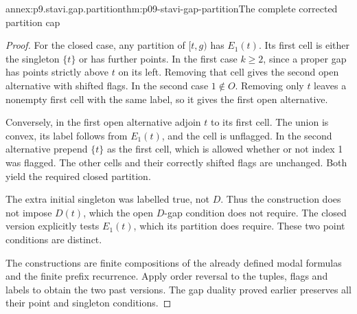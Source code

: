 \begin{annexitem}{annex:p9.stavi.gap.partition}{thm:p09-stavi-gap-partition}{The complete corrected partition cap}
\begin{proof}
For the closed
case, any
partition of
\([t,g)\)
has \(E_1(t)\).
Its first cell
is either the
singleton
\(\{t\}\)
or has further
points. In
the first
case \(k\geq2\),
since a proper
gap has points
strictly above
\(t\) on
its left.
Removing that
cell gives
the second
open alternative
with shifted
flags.
In the
second case
\(1\notin O\).
Removing only
\(t\) leaves
a nonempty
first cell
with the
same label,
so it gives
the first
open alternative.

Conversely, in
the first
open alternative
adjoin \(t\)
to its first
cell. The
union is
convex, its
label follows
from \(E_1(t)\),
and the cell
is unflagged.
In the
second alternative
prepend
\(\{t\}\)
as the
first cell,
which is
allowed whether
or not
index 1
was flagged.
The other
cells and
their correctly
shifted flags
are unchanged.
Both yield
the required
closed partition.

The extra
initial singleton
was labelled
true, not
\(D\).
Thus the
construction
does not
impose \(D(t)\),
which the
open \(D\)-gap
condition does
not require.
The closed
version explicitly
tests \(E_1(t)\),
which its
partition does
require.
These two
point conditions
are distinct.

The constructions
are finite
compositions of
the already
defined modal
formulas and
the finite
prefix recurrence.
Apply order
reversal to
the tuples,
flags and
labels to
obtain the
two past
versions.
The gap
duality proved
earlier preserves
all their
point and
singleton
conditions.
\end{proof}
\end{annexitem}

